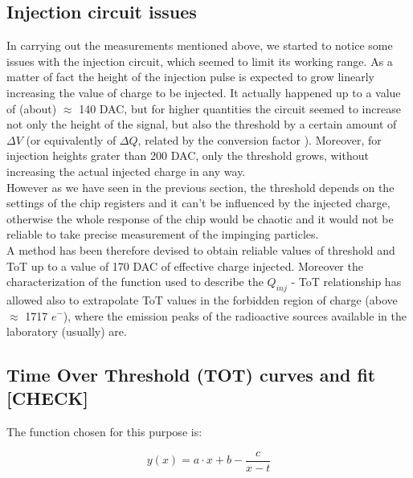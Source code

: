 \subsection{Injection circuit issues} \label{inj_issue}


In carrying out the measurements mentioned above, we started to notice some issues with the injection circuit, which seemed to limit its working range. As a matter of fact the height of the injection pulse is expected to grow linearly increasing the value of charge to be injected.
It actually happened up to a value of (about) $\approx$ 140 DAC, but for higher quantities the circuit seemed to increase not only the height of the signal, but also the threshold by a certain amount of $\Delta V$ (or equivalently of $\Delta Q$, related by the conversion factor ). Moreover, for injection heights grater than 200 DAC, only the threshold grows, without increasing the actual injected charge in any way.\\
However as we have seen in the previous section, the threshold depends on the settings of the chip registers and it can't be influenced by the injected charge, otherwise the whole response of the chip would be chaotic and it would not be reliable to take precise measurement of the impinging particles. \\

A method has been therefore devised to obtain reliable values of threshold and ToT up to a value of 170 DAC of effective charge injected. Moreover the characterization of the function used to describe the $Q_{inj}$ - ToT relationship has allowed also to extrapolate ToT values in the forbidden region of charge (above $\approx$ 1717 $e^{-}$), where the emission peaks of the radioactive sources available in the laboratory (usually) are.


\subsection{Time Over Threshold (TOT) curves and fit [CHECK]} \label{tot_fit}

The function chosen for this purpose is:

\begin{equation}
y(x) = a\cdot x +b -\frac{c}{x-t}
\label{fit_function}
\end{equation}

